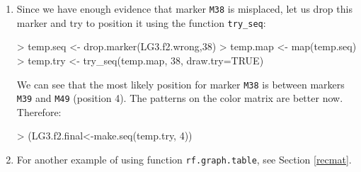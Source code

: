 \documentclass[letterpaper,12pt,oneside]{article}
\begin{document}
\begin{enumerate}
\item Since we have enough evidence that marker {\tt M38} is misplaced, let us drop this marker and try to position it using the function {\tt try_seq}:
  
\begin{Schunk}
\begin{Sinput}
> temp.seq <- drop.marker(LG3.f2.wrong,38)
> temp.map <- map(temp.seq)
> temp.try <- try_seq(temp.map, 38, draw.try=TRUE)
\end{Sinput}
\end{Schunk}

We can see that the most likely position for marker {\tt M38} is between markers {\tt M39} and {\tt M49} (position 4). The patterns on the color matrix are better now. Therefore:

\begin{Schunk}
\begin{Sinput}
> (LG3.f2.final<-make.seq(temp.try, 4))
\end{Sinput}
\end{Schunk}
  
\item For another example of using function {\tt rf.graph.table}, see Section \ref{recmat}. 

\end{enumerate}
\end{document}
